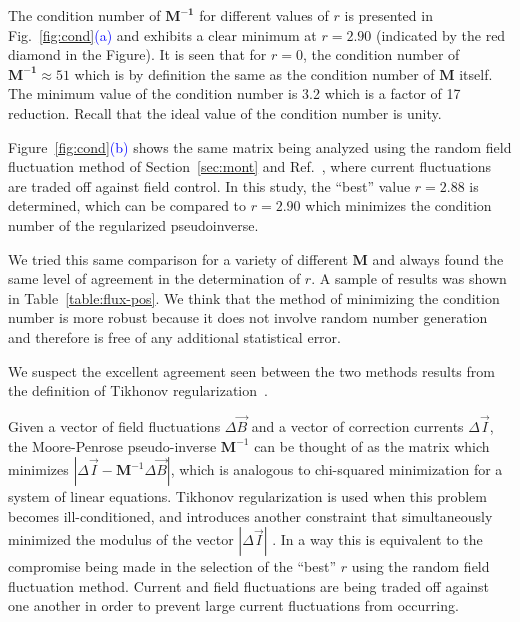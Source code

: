 

The condition number of $\bm{M^{-1}}$ for different values of $r$ is
presented in Fig.~\ref{fig:cond}\textcolor{blue}{(a)} and exhibits a
clear minimum at $r=2.90$ (indicated by the red diamond in the
Figure).  It is seen that for $r=0$, the condition number of
$\bm{M^{-1}}\approx 51$ which is by definition the same as the
condition number of $\bm{M}$ itself.  The minimum value of the
condition number is 3.2 which is a factor of 17 reduction.  Recall
that the ideal value of the condition number is unity.

Figure~\ref{fig:cond}\textcolor{blue}{(b)} shows the same matrix being
analyzed using the random field fluctuation method of
Section~\ref{sec:mont} and Ref.~\cite{bea}, where current fluctuations
are traded off against field control.  In this study, the ``best''
value $r=2.88$ is determined, which can be compared to $r=2.90$ which
minimizes the condition number of the regularized pseudoinverse.

We tried this same comparison for a variety of different $\bm{M}$ and
always found the same level of agreement in the determination of $r$.
A sample of results was shown in Table~\ref{table:flux-pos}.  We think
that the method of minimizing the condition number is more robust
because it does not involve random number generation and therefore is
free of any additional statistical error.

We suspect the excellent agreement seen between the two methods results
from the definition of Tikhonov
regularization~\cite{tikhonov2013numerical,tikhonov_book,svd,svd3}.

Given a vector of field fluctuations $\Delta\vec{B}$ and a vector of
correction currents $\Delta\vec{I}$, the Moore-Penrose pseudo-inverse
$\bm{M}^{-1}$ can be thought of as the matrix which minimizes
$|\Delta\vec{I}-\bm{M}^{-1}\Delta\vec{B}|$, which is analogous to
chi-squared minimization for a system of linear equations.  Tikhonov
regularization is used when this problem becomes ill-conditioned, and
introduces another constraint that simultaneously minimized the modulus of the vector
$|\Delta\vec{I}|$ . In a way this is equivalent to the compromise being
made in the selection of the ``best'' $r$ using the random field
fluctuation method.  Current and field fluctuations are being traded
off against one another in order to prevent large current fluctuations
from occurring.




